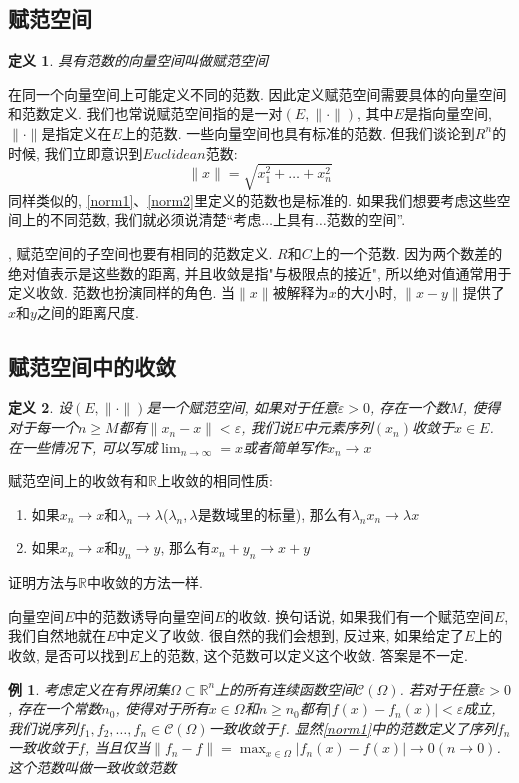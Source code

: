 \documentclass{book}
\newtheorem{definition}{\hspace{2em}定义}[section]
\newtheorem{example}{例}[section]
\begin{document}
\subsection*{赋范空间}
\begin{definition}
  具有范数的向量空间叫做赋范空间
\end{definition}
在同一个向量空间上可能定义不同的范数. 因此定义赋范空间需要具体的向量空间和范数定义. 我们也常说赋范空间指的是一对$(E,\|\cdot\|)$, 其中$E$是指向量空间, $\|\cdot\|$是指定义在$E$上的范数. 一些向量空间也具有标准的范数. 但我们谈论到$R^n$的时候, 我们立即意识到$Euclidean$范数:
\begin{equation*}
  \|x\|=\sqrt{x_1^2+\dots+x_n^2}
\end{equation*}
同样类似的, \ref{norm1}、\ref{norm2}里定义的范数也是标准的. 如果我们想要考虑这些空间上的不同范数, 我们就必须说清楚“考虑$\dots$上具有$\dots$范数的空间”.

, 赋范空间的子空间也要有相同的范数定义.
$R$和$C$上的一个范数. 因为两个数差的绝对值表示是这些数的距离, 并且收敛是指"与极限点的接近", 所以绝对值通常用于定义收敛. 范数也扮演同样的角色. 当$\|x\|$被解释为$x$的大小时, $\|x-y\|$提供了$x$和$y$之间的距离尺度.
\subsection*{赋范空间中的收敛}
\begin{definition}
  设$(E,\|\cdot\|)$是一个赋范空间, 如果对于任意$\varepsilon>0$, 存在一个数$M$, 使得对于每一个$n\geq M$都有$\|x_n-x\|<\varepsilon$, 我们说$E$中元素序列$(x_n)$收敛于$x\in E$. 在一些情况下, 可以写成$\lim_{n\to \infty}=x$或者简单写作$x_n\to x$
\end{definition}
赋范空间上的收敛有和$\mathbb{R}$上收敛的相同性质:
\begin{enumerate}
  \item 如果$x_n\to x$和$\lambda_n\to\lambda$($\lambda_n,\lambda$是数域里的标量), 那么有$\lambda_n x_n\to\lambda x$
  \item 如果$x_n\to x$和$y_n\to y$, 那么有$x_n+y_n\to x+y$
\end{enumerate}
证明方法与$\mathbb{R}$中收敛的方法一样.

\indent 向量空间$E$中的范数诱导向量空间$E$的收敛. 换句话说, 如果我们有一个赋范空间$E$,我们自然地就在$E$中定义了收敛. 很自然的我们会想到, 反过来, 如果给定了$E$上的收敛, 是否可以找到$E$上的范数, 这个范数可以定义这个收敛. 答案是不一定.
\begin{example}
  考虑定义在有界闭集$\Omega\subset \mathbb{R}^n$上的所有连续函数空间$\mathcal{C}(\Omega)$. 若对于任意$\varepsilon>0$, 存在一个常数$n_0$, 使得对于所有$x\in\Omega$和$n\geq n_0$都有$|f(x)-f_n(x)|<\varepsilon$成立, 我们说序列$f_1,f_2,\dots,f_n\in\mathcal{C}(\Omega)$一致收敛于$f$. 显然\ref{norm1}中的范数定义了序列$f_n$一致收敛于$f$, 当且仅当$\|f_n-f\|=\max_{x\in\Omega}|f_n(x)-f(x)|\to 0(n\to 0)$. 这个范数叫做一致收敛范数
\end{example}
\end{document}
